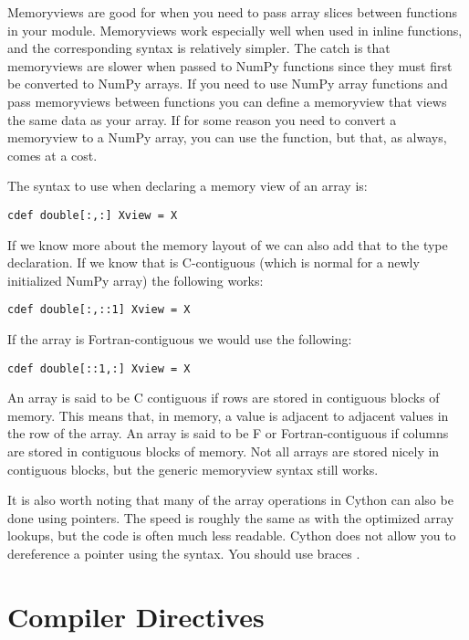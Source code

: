 Memoryviews are good for when you need to pass array slices between functions in your module.
Memoryviews work especially well when used in inline functions, and the corresponding syntax is relatively simpler.
The catch is that memoryviews are slower when passed to NumPy functions since they must first be converted to NumPy arrays.
If you need to use NumPy array functions and pass memoryviews between functions you can define a memoryview that views the same data as your array.
If for some reason you need to convert a memoryview to a NumPy array, you can use the  function, but that, as always, comes at a cost.

The syntax to use when declaring a memory view of an array  is:
\begin{lstlisting}
cdef double[:,:] Xview = X
\end{lstlisting}
If we know more about the memory layout of  we can also add that to the type declaration.
If we know that  is C-contiguous (which is normal for a newly initialized NumPy array) the following works:
\begin{lstlisting}
cdef double[:,::1] Xview = X
\end{lstlisting}
If the array is Fortran-contiguous we would use the following:
\begin{lstlisting}
cdef double[::1,:] Xview = X
\end{lstlisting}
An array is said to be C contiguous if rows are stored in contiguous blocks of memory.
This means that, in memory, a value is adjacent to adjacent values in the row of the array.
An array is said to be F or Fortran-contiguous if columns are stored in contiguous blocks of memory.
Not all arrays are stored nicely in contiguous blocks, but the generic memoryview syntax still works.

It is also worth noting that many of the array operations in Cython can also be done using pointers.
The speed is roughly the same as with the optimized array lookups, but the code is often much less readable.
Cython does not allow you to dereference a pointer using the \li{*} syntax.
You should use braces \li{[ ]}.

\section*{Compiler Directives}

